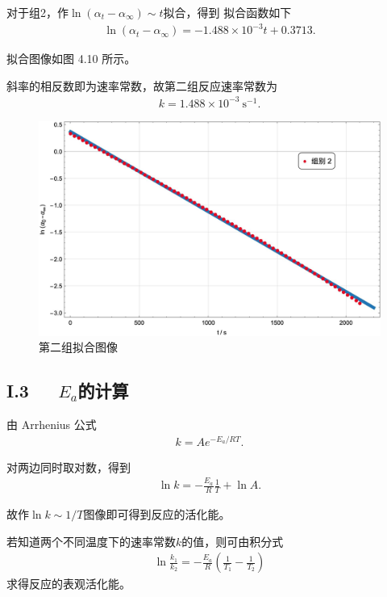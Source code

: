 \documentclass[12pt]{ctexart}
\numberwithin{equation}{section}
\begin{document}
对于组2，作$\ln(\alpha_t - \alpha_\infty) \sim t$拟合，得到
拟合函数如下
\begin{align}
    \ln(\alpha_t - \alpha_\infty) = -1.488\times 10^{-3} t + 0.3713.
    \tag{I.3}
\end{align}

拟合图像如图 4.10 所示。

斜率的相反数即为速率常数，故第二组反应速率常数为
\begin{align}
    k = 1.488\times 10^{-3}~\mathrm{s^{-1}}.
    \tag{I.4}
\end{align}

\begin{figure}[!h]
    \centering
    \includegraphics[scale=0.4]{second.jpg}
    \caption{第二组拟合图像}
\end{figure}

\pagebreak

\subsection*{I.3~~~$E_a$的计算}

由 Arrhenius 公式
\begin{align}
    k = A e^{-E_a/RT}.
    \tag{I.5}
\end{align}

对两边同时取对数，得到
\begin{align}
    \ln k = - \frac{E_a}{R}\frac{1}{T} + \ln A.
    \tag{I.7}
\end{align}

故作$\ln k \sim 1/T$图像即可得到反应的活化能。

若知道两个不同温度下的速率常数$k$的值，则可由积分式
\begin{align}
    \ln\frac{k_1}{k_2} = -\frac{E_a}{R}
        \left(\frac{1}{T_1} - \frac{1}{T_2}\right)
    \tag{I.8}
\end{align}
求得反应的表观活化能。
\end{document}
